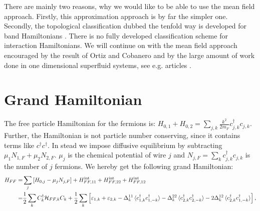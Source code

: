 There are mainly two reasons, why we would like to be able to use the mean field approach. Firstly, this approximation approach is by far the simpler one. Secondly, the topological classification dubbed the tenfold way is developed for band Hamiltonians \cite{Ryu.Topology}. There is no fully developed classification scheme for interaction Hamiltonians. We will continue on with the mean field approach encouraged by the result of Ortiz and Cobanero and by the large amount of work done in one dimensional superfluid systems, see e.g. articles \cite{Alicea, KitaevTopPhases, KitaevQuantumWires, LiYangChen, FuKane2006, GreiterIsingKitaevChain, DeGottardiMajoranaFermions, BudichTopInvMajoranaWires, ZhangWu}. 

\section{Grand Hamiltonian} \label{sec.HFFfull}
The free particle Hamiltonian for the fermions is: $H_{0,1} + H_{0,2} = \sum_{j,k}\frac{k^2}{2m_F}c^\dagger_{j,k}c_{j,k}$. Further, the Hamiltonian is not particle number conserving, since it contains terms like $c^\dagger c^\dagger$. In stead we impose diffusive equilibrium by subtracting $\mu_1N_{1,F}+\mu_2N_{2,F}$. $\mu_j$ is the chemical potential of wire $j$ and $N_{j,F} = \sum_k c^\dagger_{j,k}c_{j,k}$ is the number of $j$ fermions. We hereby get the following grand Hamiltonian:
\begin{align}
H_{FF} = &\sum_j \left[H_{0,j} - \mu_j N_{j,F}\right] + H^\text{int}_{FF,11} + H^\text{int}_{FF,22} + H^\text{int}_{FF,12} \nonumber \\
       = &\frac{1}{2}\sum_k C^\dagger_k \mathcal{H}_{FF,k}C_k + \frac{1}{2}\sum_k\left[\varepsilon_{1,k} + \varepsilon_{2,k} - \Delta^{11}_k\braket{c^\dagger_{1,k}c^\dagger_{1,-k}} - \Delta^{22}_k\braket{c^\dagger_{2,k}c^\dagger_{2,-k}} - 2\Delta^{12}_k\braket{c^\dagger_{2,k}c^\dagger_{1,-k}} \right], \nonumber
\end{align}

